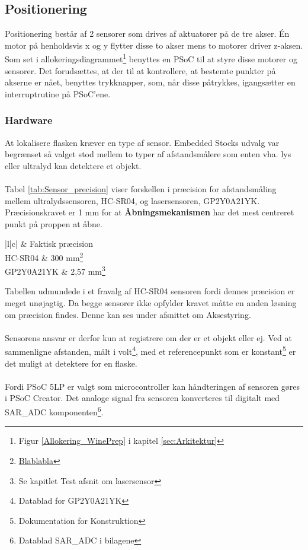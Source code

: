 \subsection{Positionering}
\label{sub:Pos}
Positionering består af 2 sensorer som drives af aktuatorer på de tre akser. Én motor på henholdsvis x og y flytter disse to akser mens to motorer driver z-aksen. \\
Som set i allokeringsdiagrammet\footnote{Figur \ref{Allokering_WinePrep} i kapitel \ref{sec:Arkitektur}} benyttes en PSoC til at styre disse motorer og sensorer. Det forudsættes, at der til at kontrollere, at bestemte punkter på akserne er nået, benyttes trykknapper, som, når disse påtrykkes, igangsætter en interruptrutine på PSoC'ene.

\subsubsection{Hardware}
\label{pos_hw}
At lokalisere flasken kræver en type af sensor. Embedded Stocks udvalg var begrænset så valget stod mellem to typer af afstandsmålere som enten vha. lys eller ultralyd kan detektere et objekt.
\\
\\
Tabel \ref{tab:Sensor_precision} viser forskellen i præcision for afstandsmåling mellem ultralydssensoren, HC-SR04, og  lasersensoren, GP2Y0A21YK. Præcisionskravet er 1 mm for at \textbf{Åbningsmekanismen} har det mest centreret punkt på proppen at åbne.

\begin{table}[H]
	\centering
	\begin{tabular}{ |l|c| }
  		\hline
   		& Faktisk præcision \\
  		\hline 
  		HC-SR04 & 300 mm\footnote{\href{https://www.elextra.dk/main.aspx?page=article&artno=H16466}{Blablabla}} \\
  		\hline
  		GP2Y0A21YK  & 2,57 mm\footnote{Se kapitlet Test afsnit om lasersensor} \\
  		\hline
	\end{tabular}
	\caption{De to sensores præcision}
	\label{tab:Sensor_precision}
\end{table}

\noindent
Tabellen udmundede i et fravalg af HC-SR04 sensoren fordi dennes præcision er meget unøjagtig. Da begge sensorer ikke opfylder kravet måtte en anden løsning om præcision findes. Denne kan ses under afsnittet om Aksestyring.
\\
\\
Sensorens ansvar er derfor kun at registrere om der er et objekt eller ej. Ved at sammenligne afstanden, målt i volt\footnote{Datablad for GP2Y0A21YK}, med et referencepunkt som er konstant\footnote{Dokumentation for Konstruktion} er det muligt at detektere for en flaske.
\\
\\
Fordi PSoC 5LP er valgt som microcontroller kan håndteringen af sensoren gøres i PSoC Creator. Det analoge signal fra sensoren konverteres til digitalt med SAR\_ADC komponenten\footnote{Datablad SAR\_ADC i bilagene}.

